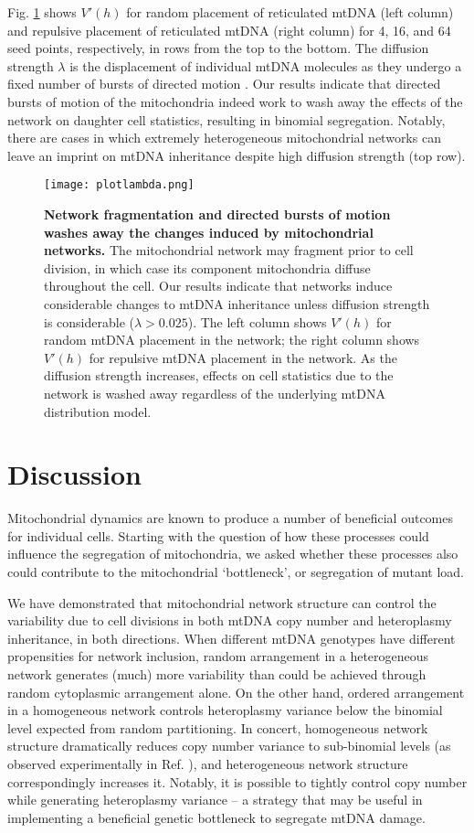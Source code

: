 \documentclass{article}
\begin{document}
Fig. \ref{fig:diffusion} shows $V'(h)$ for random placement of reticulated mtDNA (left column) and repulsive placement of reticulated mtDNA (right column) for 4, 16, and 64 seed points, respectively, in rows from the top to the bottom. The diffusion strength $\lambda$ is the displacement of individual mtDNA molecules as they undergo a fixed number of bursts of directed motion \citep{moore2021actin}. Our results indicate that directed bursts of motion of the mitochondria indeed work to wash away the effects of the network on daughter cell statistics, resulting in binomial segregation. Notably, there are cases in which extremely heterogeneous mitochondrial networks can leave an imprint on mtDNA inheritance despite high diffusion strength (top row).

\begin{figure}
\centering
\texttt{[image: plotlambda.png]}
\caption{\textbf{Network fragmentation and directed bursts of motion washes away the changes induced by mitochondrial networks.} The mitochondrial network may fragment prior to cell division, in which case its component mitochondria diffuse throughout the cell. Our results indicate that networks induce considerable changes to mtDNA inheritance unless diffusion strength is considerable ($\lambda>0.025$). The left column shows $V'(h)$ for random mtDNA placement in the network; the right column shows $V'(h)$ for repulsive mtDNA placement in the network. As the diffusion strength increases, effects on cell statistics due to the network is washed away regardless of the underlying mtDNA distribution model.}\label{fig:diffusion}
\end{figure}

\section{Discussion}
Mitochondrial dynamics are known to produce a number of beneficial outcomes for individual cells. Starting with the question of how these processes could influence the segregation of mitochondria, we asked whether these processes also could contribute to the mitochondrial `bottleneck', or segregation of mutant load.

We have demonstrated that mitochondrial network structure can control the variability due to cell divisions in both mtDNA copy number and heteroplasmy inheritance, in both directions. When different mtDNA genotypes have different propensities for network inclusion, random arrangement in a heterogeneous network generates (much) more variability than could be achieved through random cytoplasmic arrangement alone. On the other hand, ordered arrangement in a homogeneous network controls heteroplasmy variance below the binomial level expected from random partitioning. In concert, homogeneous network structure dramatically reduces copy number variance to sub-binomial levels (as observed experimentally in Ref. \cite{jajoo2016accurate}), and heterogeneous network structure correspondingly increases it. Notably, it is possible to tightly control copy number while generating heteroplasmy variance -- a strategy that may be useful in implementing a beneficial genetic bottleneck to segregate mtDNA damage.
\end{document}
